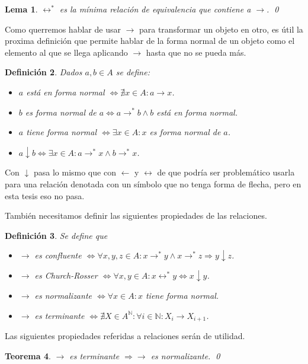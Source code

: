 \documentclass[12pt]{report}
\theoremstyle{customstyle}
\newtheorem{theorem}{Teorema}[chapter]
\newtheorem{definition}[theorem]{Definición}
\newtheorem{lemma}[theorem]{Lema}
\theoremstyle{factstyle}
\begin{document}
\begin{lemma}\label{lemma:↔* min equiv que contiene a →}
  $↔^*$ es la mínima relación de equivalencia que contiene a $→$.
  \qed
\end{lemma}

Como querremos hablar de usar $→$ para transformar un objeto en otro, es útil la proxima definición que permite hablar de la forma normal de un objeto como el elemento al que se llega aplicando $→$ hasta que no se pueda más.

\begin{definition}\label{def:forma normal}
  Dados $a, b ∈ A$ se define:
  \begin{itemize}
    \item $a$ está en forma normal $⇔ ∄x ∈ A : a → x$.
    \item $b$ es forma normal de $a ⇔ a →^* b ∧ b$ está en forma normal.
    \item $a$ tiene forma normal $⇔ ∃x ∈ A : x$ es forma normal de $a$.
    \item $a ↓ b ⇔ ∃x ∈ A : a →^* x ∧ b →^* x$.
  \end{itemize}
\end{definition}

Con $↓$ pasa lo mismo que con $←$ y $↔$ de que podría ser problemático usarla para una relación denotada con un símbolo que no tenga forma de flecha, pero en esta tesis eso no pasa.

También necesitamos definir las siguientes propiedades de las relaciones.

\begin{definition} Se define que
  \begin{itemize}
    \item $→$ es confluente $⇔ ∀x, y, z ∈ A : x →^* y ∧ x →^* z ⇒ y ↓ z$.
    \item $→$ es Church-Rosser $⇔ ∀x, y ∈ A : x ↔^* y ⇔ x ↓ y$.
    \item $→$ es normalizante $⇔ ∀x ∈ A : x$ tiene forma normal.
    \item $→$ es terminante $⇔ ∄X ∈ A^ℕ : ∀i ∈ ℕ : X_i → X_{i + 1}$.
  \end{itemize}
\end{definition}

Las siguientes propiedades referidas a relaciones serán de utilidad.

\begin{theorem}\label{thm:terminante ⇒ normalizante}
  $→$ es terminante $⇒ →$ es normalizante.
  \qed
\end{theorem}
\end{document}
